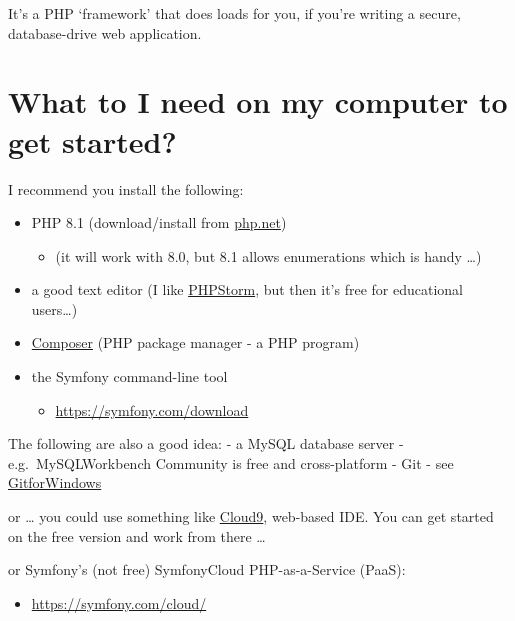 \documentclass[a4paperpaper,openright]{book}
\providecommand{\tightlist}{%
  \setlength{\itemsep}{0pt}\setlength{\parskip}{0pt}}
\begin{document}
It's a PHP `framework' that does loads for you, if you're writing a
secure, database-drive web application.

\hypertarget{what-to-i-need-on-my-computer-to-get-started}{%
\section{What to I need on my computer to get
started?}\label{what-to-i-need-on-my-computer-to-get-started}}

I recommend you install the following:

\begin{itemize}
\item
  PHP 8.1 (download/install from \href{https://php.net/}{php.net})

  \begin{itemize}
  \tightlist
  \item
    (it will work with 8.0, but 8.1 allows enumerations which is handy
    \ldots{})
  \end{itemize}
\item
  a good text editor (I like
  \href{https://www.jetbrains.com/phpstorm/specials/phpstorm/phpstorm.html?\&gclid=CJTK_8SDrtICFWq-7Qodh98NpQ\&gclsrc=aw.ds.ds\&dclid=CNPY28WDrtICFQGn7QodqekBWg}{PHPStorm},
  but then it's free for educational users\ldots{})
\item
  \href{https://getcomposer.org/}{Composer} (PHP package manager - a PHP
  program)
\item
  the Symfony command-line tool

  \begin{itemize}
  \tightlist
  \item
    \url{https://symfony.com/download}
  \end{itemize}
\end{itemize}

The following are also a good idea: - a MySQL database server -
e.g.~MySQLWorkbench Community is free and cross-platform - Git - see
\href{https://git-scm.com/download/win}{GitforWindows}

or \ldots{} you could use something like
\href{https://c9.io/dr_matt_smith}{Cloud9}, web-based IDE. You can get
started on the free version and work from there \ldots{}

or Symfony's (not free) SymfonyCloud PHP-as-a-Service (PaaS):

\begin{itemize}
\tightlist
\item
  \url{https://symfony.com/cloud/}
\end{itemize}
\end{document}
